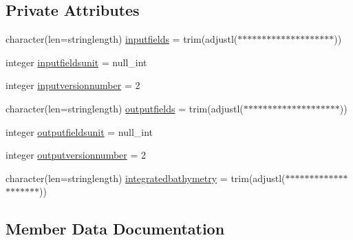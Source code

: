 \subsection*{Private Attributes}
\begin{DoxyCompactItemize}
\item 
character(len=stringlength) \mbox{\hyperlink{structmodulehydrodynamicfile_1_1t__files_a61f47a0b95a589aab381c69b77039e25}{inputfields}} = trim(adjustl(\textquotesingle{}$\ast$$\ast$$\ast$$\ast$$\ast$$\ast$$\ast$$\ast$$\ast$$\ast$$\ast$$\ast$$\ast$$\ast$$\ast$$\ast$$\ast$$\ast$$\ast$$\ast$\textquotesingle{}))
\item 
integer \mbox{\hyperlink{structmodulehydrodynamicfile_1_1t__files_a633f85e0b72ad952e8757ebbb57161e4}{inputfieldsunit}} = null\+\_\+int
\item 
integer \mbox{\hyperlink{structmodulehydrodynamicfile_1_1t__files_ae8ec19c1bd85e39d83b8feec4b91490b}{inputversionnumber}} = 2
\item 
character(len=stringlength) \mbox{\hyperlink{structmodulehydrodynamicfile_1_1t__files_a01d19070d111c50c137a53c2f836bcef}{outputfields}} = trim(adjustl(\textquotesingle{}$\ast$$\ast$$\ast$$\ast$$\ast$$\ast$$\ast$$\ast$$\ast$$\ast$$\ast$$\ast$$\ast$$\ast$$\ast$$\ast$$\ast$$\ast$$\ast$$\ast$\textquotesingle{}))
\item 
integer \mbox{\hyperlink{structmodulehydrodynamicfile_1_1t__files_a597d0a12937fff3cd8a3a209b904f14c}{outputfieldsunit}} = null\+\_\+int
\item 
integer \mbox{\hyperlink{structmodulehydrodynamicfile_1_1t__files_a7162b87c9e5e2054a806b0e19fe6a51d}{outputversionnumber}} = 2
\item 
character(len=stringlength) \mbox{\hyperlink{structmodulehydrodynamicfile_1_1t__files_afc3bc0630fef06f5e5d8d17e975cf6ca}{integratedbathymetry}} = trim(adjustl(\textquotesingle{}$\ast$$\ast$$\ast$$\ast$$\ast$$\ast$$\ast$$\ast$$\ast$$\ast$$\ast$$\ast$$\ast$$\ast$$\ast$$\ast$$\ast$$\ast$$\ast$$\ast$\textquotesingle{}))
\end{DoxyCompactItemize}


\subsection{Member Data Documentation}
\mbox{\label{structmodulehydrodynamicfile_1_1t__files_a61f47a0b95a589aab381c69b77039e25}} 
